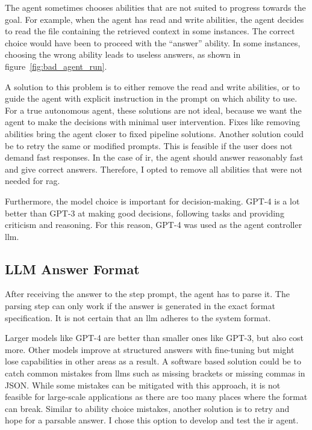 \documentclass[../main.tex]{subfiles}
\begin{document}
The agent sometimes chooses abilities that are not suited to progress towards the goal.
For example, when the agent has read and write abilities, the agent decides to
read the file containing the retrieved context in some instances.
The correct choice would have been to proceed with the ``answer'' ability.
In some instances, choosing the wrong ability leads to useless answers,
as shown in figure~\ref{fig:bad_agent_run}.

A solution to this problem is to either remove the read and write abilities,
or to guide the agent with explicit instruction in the prompt on which ability to use.
For a true autonomous agent, these solutions are not ideal, because we want the
agent to make the decisions with minimal user intervention.
Fixes like removing abilities bring the agent closer to fixed pipeline solutions.
Another solution could be to retry the same or modified prompts.
This is feasible if the user does not demand fast responses.
In the case of \gls{ir}, the agent should answer reasonably fast and
give correct answers.
Therefore, I opted to remove all abilities that were not needed for \gls{rag}.

Furthermore, the model choice is important for decision-making.
GPT-4 is a lot better than GPT-3 at making good decisions, following tasks and providing
criticism and reasoning.
For this reason, GPT-4 was used as the agent controller \gls{llm}.

\subsection{LLM Answer Format}

After receiving the answer to the step prompt, the agent has to parse it.
The parsing step can only work if the answer is generated in the exact format specification.
It is not certain that an \gls{llm} adheres to the system format.

Larger models like GPT-4 are better than smaller ones like GPT-3, but also cost more.
Other models improve at structured answers with fine-tuning
but might lose capabilities in other areas as a result.
A software based solution could be to catch common mistakes from \glspl{llm}
such as missing brackets or missing commas in JSON.
While some mistakes can be mitigated with this approach, it is not feasible
for large-scale applications as there are too many places where the format can break.
Similar to ability choice mistakes, another solution is to retry
and hope for a parsable answer.
I chose this option to develop and test the \gls{ir} agent.
\end{document}
